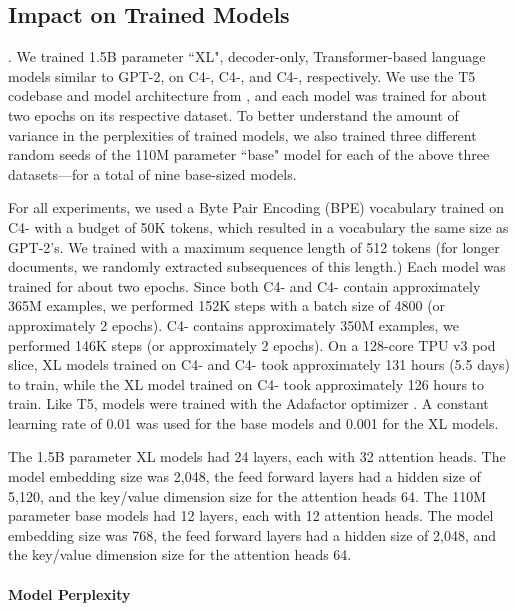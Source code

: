 \subsection{Impact on Trained Models}
\label{sec:impact-trained-models}.
We trained 1.5B parameter ``XL", decoder-only, Transformer-based language models similar to GPT-2, on C4-\Original, C4-\Approx, and C4-\Exact, respectively.
We use the T5 codebase and model architecture from \citet{raffel2019exploring}, and each model was trained for about two epochs on its respective dataset.
To better understand the amount of variance in the perplexities of trained models, we also trained three different random seeds of the 110M parameter ``base" model for each of the above three datasets---for a total of nine base-sized models.

For all experiments, we used a Byte Pair Encoding (BPE) vocabulary trained on C4-\Approx{} with a budget of 50K tokens, which resulted in a vocabulary the same size as GPT-2's.
We trained with a maximum sequence length of 512 tokens (for longer documents, we randomly extracted subsequences of this length.)
Each model was trained for about two epochs.
Since both C4-\Original{} and C4-\Exact{} contain approximately 365M examples, we performed 152K steps with a batch size of 4800 (or approximately 2 epochs). 
C4-\Approx{} contains approximately 350M examples, we performed 146K steps (or approximately 2 epochs).
On a 128-core TPU v3 pod slice, XL models trained on C4-\Original{} and C4-\Exact{} took approximately 131 hours (5.5 days) to train, while the XL model trained on C4-\Approx{} took approximately 126 hours to train.
Like T5, models were trained with the Adafactor optimizer \citep{shazeer2018adafactor}. A constant learning rate of 0.01 was used for the base models and 0.001 for the XL models.

The 1.5B parameter XL models had 24 layers, each with 32 attention heads. The model embedding size was 2,048, the feed forward layers had a hidden size of 5,120, and the key/value dimension size for the attention heads 64.
The 110M parameter base models had 12 layers, each with 12 attention heads.
The model embedding size was 768, the feed forward layers had a hidden size of 2,048, and the key/value dimension size for the attention heads 64.

\paragraph{Model Perplexity}\label{sec:perplexity-results}


